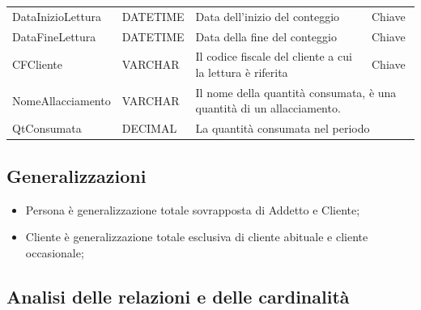 \begin{center}
    \begin{tabularx}{\textwidth}{|l|l|l|X|}
        \hline
        \rowcolor{gray!30}
        \multicolumn{4}{|c|}{\textbf{Consumo}}\\
        \hline
        DataInizioLettura & DATETIME & Data dell'inizio del conteggio & Chiave \\
        \hline
        DataFineLettura & DATETIME & Data della fine del conteggio & Chiave \\
        \hline
        CFCliente & VARCHAR & Il codice fiscale del cliente a cui la lettura è riferita & Chiave \\
        \hline
        NomeAllacciamento & VARCHAR & \multicolumn{2}{l|}{Il nome della quantità consumata, è una quantità di un allacciamento.} \\
        \hline
        QtConsumata & DECIMAL & \multicolumn{2}{l|}{La quantità consumata nel periodo} \\
        \hline
    \end{tabularx}
\end{center}

\subsection{Generalizzazioni}

\begin{itemize}
    \item Persona è generalizzazione totale sovrapposta di Addetto e Cliente;
    \item Cliente è generalizzazione totale esclusiva di cliente abituale e cliente occasionale;
\end{itemize}

\subsection{Analisi delle relazioni e delle cardinalità}

